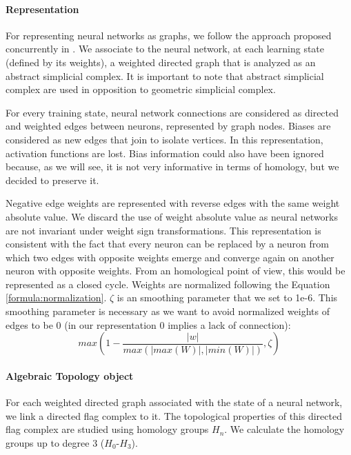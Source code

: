 \documentclass{article}
\begin{document}
\paragraph{Representation} For representing neural networks as graphs, we follow the approach proposed concurrently in \citet{anonymous}. We associate to the neural network, at each learning state (defined by its weights), a weighted directed graph that is analyzed as an abstract simplicial complex. It is important to note that abstract simplicial complex are used in opposition to geometric simplicial complex.

For every training state, neural network connections are considered as directed and weighted edges between neurons, represented by graph nodes. Biases are considered as new edges that join to isolate vertices. In this representation, activation functions are lost. Bias information could also have been ignored because, as we will see, it is not very informative in terms of homology, but we decided to preserve it.

Negative edge weights are represented with reverse edges with the same weight absolute value. We discard the use of weight absolute value as neural networks are not invariant under weight sign transformations. This representation is consistent with the fact that every neuron can be replaced by a neuron from which two edges with opposite weights emerge and converge again on another neuron with opposite weights. From an homological point of view, this would be represented as a closed cycle. Weights are normalized following the Equation \ref{formula:normalization}. $\zeta$ is an smoothing parameter that we set to 1e-6. This smoothing parameter is necessary as we want to avoid normalized weights of edges to be 0 (in our representation 0 implies a lack of connection):
\begin{equation}
\label{formula:normalization}
max(1 - \frac{|w|}{max(|max(W)|, |min(W)|)}, \zeta)
\end{equation}

\paragraph{Algebraic Topology object} For each weighted directed graph associated with the state of a neural network, we link a directed flag complex to it. The topological properties of this directed flag complex are studied using homology groups $H_n$. We calculate the homology groups up to degree 3 ($H_0$-$H_3$).
\end{document}
